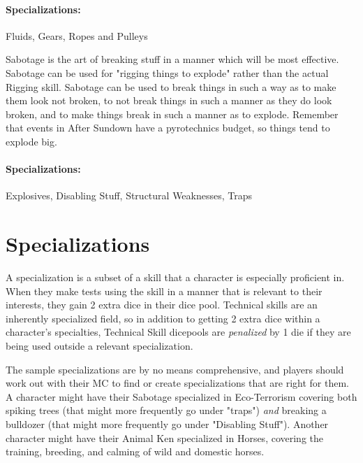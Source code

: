 \paragraph{Specializations:} Fluids, Gears, Ropes and Pulleys


\hspace{\parindent} Sabotage is the art of breaking stuff in a manner which will be most effective. Sabotage can be used for "rigging things to explode" rather than the actual Rigging skill. Sabotage can be used to break things in such a way as to make them look not broken, to not break things in such a manner as they do look broken, and to make things break in such a manner as to explode. Remember that events in After Sundown have a pyrotechnics budget, so things tend to explode big.

\paragraph{Specializations:} Explosives, Disabling Stuff, Structural Weaknesses, Traps

\section{Specializations}

A specialization is a subset of a skill that a character is especially proficient in. When they make tests using the skill in a manner that is relevant to their interests, they gain 2 extra dice in their dice pool. Technical skills are an inherently specialized field, so in addition to getting 2 extra dice within a character's specialties, Technical Skill dicepools are \textit{penalized} by 1 die if they are being used outside a relevant specialization.

The sample specializations are by no means comprehensive, and players should work out with their MC to find or create specializations that are right for them. A character might have their Sabotage specialized in Eco-Terrorism covering both spiking trees (that might more frequently go under "traps") \textit{and} breaking a bulldozer (that might more frequently go under "Disabling Stuff"). Another character might have their Animal Ken specialized in Horses, covering the training, breeding, and calming of wild and domestic horses. 

